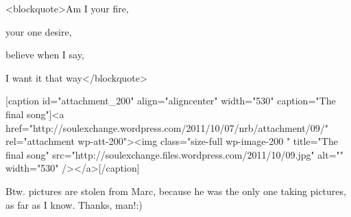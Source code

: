 \begin{post}
\begin{content}
<blockquote>Am I your fire,

your one desire,

believe when I say,

I want it that way</blockquote>

[caption id="attachment_200" align="aligncenter" width="530" caption="The final song"]<a href="http://soulexchange.wordpress.com/2011/10/07/nrb/attachment/09/" rel="attachment wp-att-200"><img class="size-full wp-image-200 " title="The final song" src="http://soulexchange.files.wordpress.com/2011/10/09.jpg" alt="" width="530" /></a>[/caption]



Btw. pictures are stolen from Marc, because he was the only one taking pictures, as far as I know. Thanks, man!:)
	\end{content}
\end{post}

